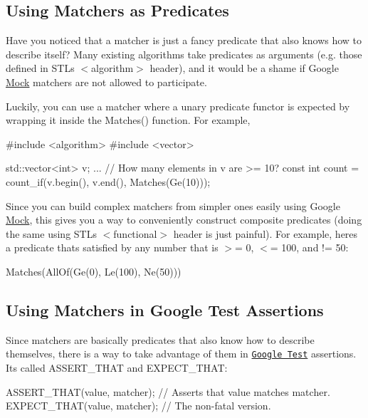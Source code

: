 \subsection*{Using Matchers as Predicates}

Have you noticed that a matcher is just a fancy predicate that also knows how to describe itself? Many existing algorithms take predicates as arguments (e.\+g. those defined in S\+TL\textquotesingle{}s {\ttfamily $<$algorithm$>$} header), and it would be a shame if Google \hyperlink{class_mock}{Mock} matchers are not allowed to participate.

Luckily, you can use a matcher where a unary predicate functor is expected by wrapping it inside the {\ttfamily Matches()} function. For example,


\begin{DoxyCode}
#include <algorithm>
#include <vector>

std::vector<int> v;
...
// How many elements in v are >= 10?
const int count = count\_if(v.begin(), v.end(), Matches(Ge(10)));
\end{DoxyCode}


Since you can build complex matchers from simpler ones easily using Google \hyperlink{class_mock}{Mock}, this gives you a way to conveniently construct composite predicates (doing the same using S\+TL\textquotesingle{}s {\ttfamily $<$functional$>$} header is just painful). For example, here\textquotesingle{}s a predicate that\textquotesingle{}s satisfied by any number that is $>$= 0, $<$= 100, and != 50\+:


\begin{DoxyCode}
Matches(AllOf(Ge(0), Le(100), Ne(50)))
\end{DoxyCode}


\subsection*{Using Matchers in Google Test Assertions}

Since matchers are basically predicates that also know how to describe themselves, there is a way to take advantage of them in \href{http://code.google.com/p/googletest/}{\tt Google Test} assertions. It\textquotesingle{}s called {\ttfamily A\+S\+S\+E\+R\+T\+\_\+\+T\+H\+AT} and {\ttfamily E\+X\+P\+E\+C\+T\+\_\+\+T\+H\+AT}\+:


\begin{DoxyCode}
ASSERT\_THAT(value, matcher);  // Asserts that value matches matcher.
EXPECT\_THAT(value, matcher);  // The non-fatal version.
\end{DoxyCode}


